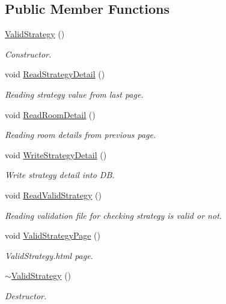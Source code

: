 \subsection*{\-Public \-Member \-Functions}
\begin{DoxyCompactItemize}
\item 
\hyperlink{classValidStrategy_ae168db88ebfa1eabdd7f241a631ffc27}{\-Valid\-Strategy} ()
\begin{DoxyCompactList}\small\item\em \-Constructor. \end{DoxyCompactList}\item 
void \hyperlink{classValidStrategy_ae8b17f98d81f8f70d974139086495dfa}{\-Read\-Strategy\-Detail} ()
\begin{DoxyCompactList}\small\item\em \-Reading strategy value from last page. \end{DoxyCompactList}\item 
void \hyperlink{classValidStrategy_acf1a8763ec29b441c822a9ab8c80dc4b}{\-Read\-Room\-Detail} ()
\begin{DoxyCompactList}\small\item\em \-Reading room details from previous page. \end{DoxyCompactList}\item 
void \hyperlink{classValidStrategy_a093620e19cef0865e6e38a26bb41b8bd}{\-Write\-Strategy\-Detail} ()
\begin{DoxyCompactList}\small\item\em \-Write strategy detail into \-D\-B. \end{DoxyCompactList}\item 
void \hyperlink{classValidStrategy_a234ca3ab5aa4684306148afa47b6860b}{\-Read\-Valid\-Strategy} ()
\begin{DoxyCompactList}\small\item\em \-Reading validation file for checking strategy is valid or not. \end{DoxyCompactList}\item 
void \hyperlink{classValidStrategy_ad89451a935f815b4c85b595135d70d94}{\-Valid\-Strategy\-Page} ()
\begin{DoxyCompactList}\small\item\em \-Valid\-Strategy.\-html page. \end{DoxyCompactList}\item 
\hyperlink{classValidStrategy_aec9e6ff1c9e9058a17f5488fe3e6cfec}{$\sim$\-Valid\-Strategy} ()
\begin{DoxyCompactList}\small\item\em \-Destructor. \end{DoxyCompactList}\end{DoxyCompactItemize}
